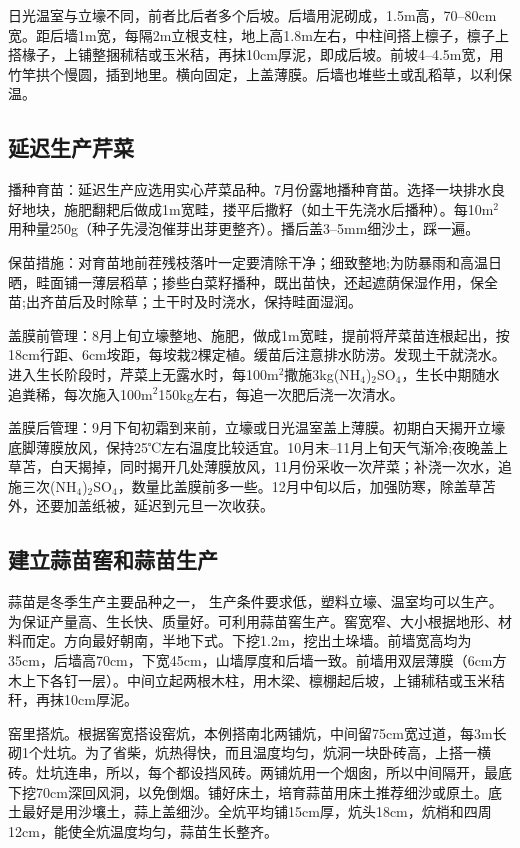 \documentclass{ctexbook}
\begin{document}
日光温室与立壕不同，前者比后者多个后坡。后墙用泥砌成，1.5m高，70--80cm宽。距后墙1m宽，每隔2m立根支柱，地上高1.8m左右，中柱间搭上檩子，檩子上搭椽子，上铺整捆秫秸或玉米秸，再抹10cm厚泥，即成后坡。前坡4--4.5m宽，用竹竿拱个慢圆，插到地里。横向固定，上盖薄膜。后墙也堆些土或乱稻草，以利保温。
\subsection{延迟生产芹菜}
播种育苗：延迟生产应选用实心芹菜品种。7月份露地播种育苗。选择一块排水良好地块，施肥翻耙后做成1m宽畦，搂平后撒籽（如土干先浇水后播种）。每10m$^2$用种量250g（种子先浸泡催芽出芽更整齐）。播后盖3--5mm细沙土，踩一遍。

保苗措施：对育苗地前茬残枝落叶一定要清除干净；细致整地;为防暴雨和高温日晒，畦面铺一薄层稻草；掺些白菜籽播种，既出苗快，还起遮荫保湿作用，保全苗;出齐苗后及时除草；土干时及时浇水，保持畦面湿润。

盖膜前管理：8月上旬立壕整地、施肥，做成1m宽畦，提前将芹菜苗连根起出，按18cm行距、6cm垵距，每垵栽2棵定植。缓苗后注意排水防涝。发现土干就浇水。进入生长阶段时，芹菜上无露水时，每100m$^2$撒施3kg(NH$_4$)$_2$SO$_4$，生长中期随水追粪稀，每次施入100m$^2$150kg左右，每追一次肥后浇一次清水。

盖膜后管理：9月下旬初霜到来前，立壕或日光温室盖上薄膜。初期白天揭开立壕底脚薄膜放风，保持25℃左右温度比较适宜。10月末--11月上旬天气渐冷;夜晚盖上草苫，白天揭掉，同时揭开几处薄膜放风，11月份采收一次芹菜；补浇一次水，追施三次(NH$_4$)$_2$SO$_4$，数量比盖膜前多一些。12月中旬以后，加强防寒，除盖草苫外，还要加盖纸被，延迟到元旦一次收获。
\subsection{建立蒜苗窖和蒜苗生产}
蒜苗是冬季生产主要品种之一，	生产条件要求低，塑料立壕、温室均可以生产。为保证产量高、生长快、质量好。可利用蒜苗窖生产。窖宽窄、大小根据地形、材料而定。方向最好朝南，半地下式。下挖1.2m，挖出土垛墙。前墙宽高均为35cm，后墙高70cm，下宽45cm，山墙厚度和后墙一致。前墙用双层薄膜（6cm方木上下各钉一层）。中间立起两根木柱，用木梁、檩棚起后坡，上铺秫秸或玉米秸秆，再抹10cm厚泥。

窑里搭炕。根据窖宽搭设窑炕，本例搭南北两铺炕，中间留75cm宽过道，每3m长砌1个灶坑。为了省柴，炕热得快，而且温度均匀，炕洞一块卧砖高，上搭一横砖。灶坑连串，所以，每个都设挡风砖。两铺炕用一个烟囱，所以中间隔开，最底下挖70cm深回风洞，以免倒烟。铺好床土，培育蒜苗用床土推荐细沙或原土。底土最好是用沙壤土，蒜上盖细沙。全炕平均铺15cm厚，炕头18cm，炕梢和四周12cm，能使全炕温度均匀，蒜苗生长整齐。
\end{document}
